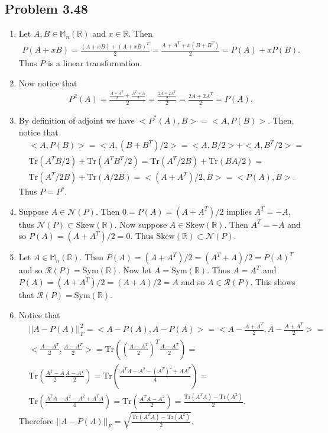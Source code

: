 \documentclass[letterpaper,12pt]{article}
\theoremstyle{definition}
\begin{document}
\begin{spacing}{1.3}{}
\subsection*{Problem 3.48}
\begin{enumerate}
  \item
  Let $A,B\in\mathbb M_n(\mathbb R)$ and $x\in\mathbb R$.
	Then
	\begin{align*}
	P(A+xB)=\frac{(A+xB)+(A+xB)^T}{2}=
	\frac{A+A^T+x(B+B^T)}{2}=P(A)+xP(B).
	\end{align*}
	Thus $P$ is a linear transformation.
	\item
		Now notice that
	\begin{align*}
	P^2(A)=\frac{\frac{A+A^T}{2}+\frac{A^T+A}{2}}{2}=
	\frac{\frac{2A+2A^T}{2}}{2}=\frac{2A+2A^T}{2}=P(A).
	\end{align*}
	\item
		By definition of adjoint we have $<P^*(A),B>=<A,P(B)>$.
	Then, notice that
	\begin{align*}
	&<A,P(B)>=<A,(B+B^T)/2>=
	<A,B/2>+<A,B^T/2>=\\
	&\text{Tr}(A^TB/2)+\text{Tr}(A^TB^T/2)=
	\text{Tr}(A^T/2B)+\text{Tr}(BA/2)=\\
	&\text{Tr}(A^T/2B)+\text{Tr}(A/2B)=
	<(A+A^T)/2,B>=<P(A),B>.
	\end{align*}
	Thus $P=P^*$.
	\item
		Suppose $A\in\mathcal N(P)$.
	Then $0=P(A)=(A+A^T)/2$ implies $A^T=-A$, thus $\mathcal N(P)\subset\text{Skew}(\mathbb R)$.
	Now suppose $A\in\text{Skew}(\mathbb R)$.
	Then $A^T=-A$ and so $P(A)=(A+A^T)/2=0$. Thus $\text{Skew}(\mathbb R)\subset\mathcal N(P)$.
	\item
	Let $A\in\mathbb M_n(\mathbb R)$.
	Then $P(A)=(A+A^T)/2=(A^T+A)/2=P(A)^T$ and so $\mathcal R(P)=\text{Sym}(\mathbb R)$.
	Now let $A=\text{Sym}(\mathbb R)$.
	Thus $A=A^T$ and $P(A)=(A+A^T)/2=(A+A)/2=A$ and so $A\in\mathcal R(P)$.
	This shows that $\mathcal R(P)=\text{Sym}(\mathbb R)$.
	\item
	Notice that
	\begin{align*}
	&||A - P(A)||_F^2 = <A - P(A), A - P(A)> =
	<A - \frac{A + A^T}{2}, A - \frac{A + A^T}{2}> =\\
	&<\frac{A - A^T}{2}, \frac{A - A^T}{2}> =
	\text{Tr}\left(\left(\frac{A - A^T}{2}\right)^T\frac{A - A^T}{2}\right)=\\
	&\text{Tr}\left(\frac{A^T - A}{2}\frac{A - A^T}{2}\right) =
	\text{Tr}\left(\frac{A^TA - A^2 - (A^T)^2 + AA^T}{4}\right) =\\
	&\text{Tr}\left(\frac{A^TA - A^2 - A^2 + A^TA}{4}\right) =
	\text{Tr}\left(\frac{A^TA - A^2}{2}\right) =
	\frac{\text{Tr}(A^TA) - \text{Tr}(A^2)}{2}.
	\end{align*}
	Therefore $||A - P(A)||_F = \sqrt{\frac{\text{Tr}(A^TA) - \text{Tr}(A^2)}{2}}$. \\


\end{enumerate}
\end{spacing}
\end{document}
